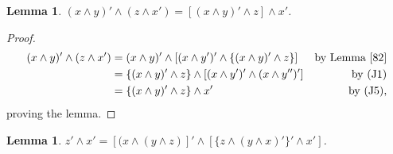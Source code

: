 \documentclass{amsart}
\theoremstyle{plain}
\newtheorem{lemma}[theorem]{Lemma}
\theoremstyle{problem}
\theoremstyle{definition}
\theoremstyle{remark}
\numberwithin{equation}{section}
\begin{document}
\begin{lemma} \label{84}
    $(x \land y)' \land (z \land x') = [(x \land y)' \land z] \land x' $.
\end{lemma}
\begin{proof}
\begin{align*}
    (x \land y)' \land (z \land x')
               &= (x \land y)' \land [(x \land y')' \land \{(x \land y)' \land z\}] &\text{by Lemma \ref{82}}\\
               &= \{(x \land y)' \land z\} \land [(x \land y')' \land (x \land y'')'] &\text{by (J1)}\\
               &= \{(x \land y)' \land z\} \land x' &\text{by (J5)},
\end{align*}
proving the lemma.
\end{proof}

\begin{lemma} \label{85}
    $ z' \land x' = [(x \land (y \land z)]' \land [\{z \land (y \land x)'\}' \land x'] $.
\end{lemma}
\end{document}
